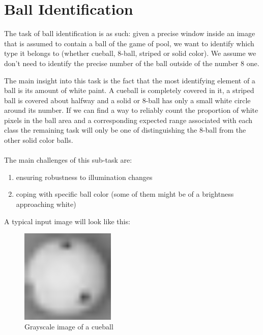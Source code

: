 
\section{Ball Identification}

The task of ball identification is as such: 
given a precise window inside an image that is assumed to 
contain a ball of the game of pool, we want to identify 
which type it belongs to (whether cueball, 8-ball, striped or 
solid color). We assume we don't need to identify the precise 
number of the ball outside of the number 8 one.

The main insight into this task is the fact that the most 
identifying element of a ball is its amount of white paint. 
A cueball is completely covered in it, a striped ball is 
covered about halfway and a solid or 8-ball has only a small 
white circle around its number. If we can find a way to 
reliably count the proportion of white pixels in the ball area 
and a corresponding expected range associated with each class 
the remaining task will only be one of distinguishing the 
8-ball from the other solid color balls.
\\ \\
The main challenges of this sub-task are:
\begin{enumerate}
  \item ensuring robustness to illumination changes
  \item coping with specific ball color 
  (some of them might be of a brightness approaching white)
\end{enumerate}

\noindent
A typical input image will look like this:
\begin{figure}[h]
  \centering
  \includegraphics[width=0.4\textwidth]{./imgs/cueball_grey.png}
  \caption{Grayscale image of a cueball}
\end{figure}

